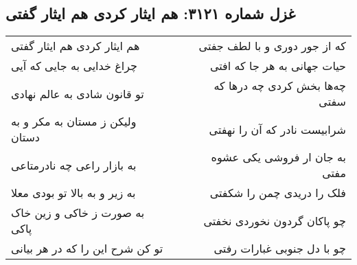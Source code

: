 \begin{center}
\section*{غزل شماره ۳۱۲۱: هم ایثار کردی هم ایثار گفتی}
\label{sec:3121}
\begin{longtable}{l p{0.5cm} r}
هم ایثار کردی هم ایثار گفتی
&&
که از جور دوری و با لطف جفتی
\\
چراغ خدایی به جایی که آیی
&&
حیات جهانی به هر جا که افتی
\\
تو قانون شادی به عالم نهادی
&&
چه‌ها بخش کردی چه درها که سفتی
\\
ولیکن ز مستان به مکر و به دستان
&&
شرابیست نادر که آن را نهفتی
\\
به بازار راعی چه نادرمتاعی
&&
به جان ار فروشی یکی عشوه مفتی
\\
به زیر و به بالا تو بودی معلا
&&
فلک را دریدی چمن را شکفتی
\\
به صورت ز خاکی و زین خاک پاکی
&&
چو پاکان گردون نخوردی نخفتی
\\
تو کن شرح این را که در هر بیانی
&&
چو با دل جنوبی غبارات رفتی
\\
\end{longtable}
\end{center}
